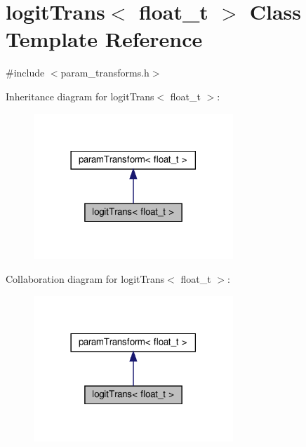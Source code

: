 \hypertarget{classlogitTrans}{}\section{logit\+Trans$<$ float\+\_\+t $>$ Class Template Reference}
\label{classlogitTrans}


{\ttfamily \#include $<$param\+\_\+transforms.\+h$>$}



Inheritance diagram for logit\+Trans$<$ float\+\_\+t $>$\+:\nopagebreak
\begin{figure}[H]
\begin{center}
\leavevmode
\includegraphics[width=213pt]{classlogitTrans__inherit__graph}
\end{center}
\end{figure}


Collaboration diagram for logit\+Trans$<$ float\+\_\+t $>$\+:\nopagebreak
\begin{figure}[H]
\begin{center}
\leavevmode
\includegraphics[width=213pt]{classlogitTrans__coll__graph}
\end{center}
\end{figure}
